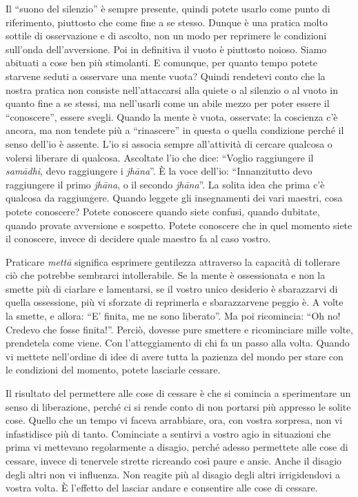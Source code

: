 Il ``suono del silenzio'' è sempre presente, quindi potete usarlo come
punto di riferimento, piuttosto che come fine a se stesso. Dunque è una
pratica molto sottile di osservazione e di ascolto, non un modo per
reprimere le condizioni sull'onda dell'avversione. Poi in definitiva il
vuoto è piuttosto noioso. Siamo abituati a cose ben più stimolanti. E
comunque, per quanto tempo potete starvene seduti a osservare una mente
vuota? Quindi rendetevi conto che la nostra pratica non consiste
nell'attaccarsi alla quiete o al silenzio o al vuoto in quanto fine a se
stessi, ma nell'usarli come un abile mezzo per poter essere il
``conoscere'', essere svegli. Quando la mente è vuota, osservate: la
coscienza c'è ancora, ma non tendete più a ``rinascere'' in questa o
quella condizione perché il senso dell'io è assente. L'io si associa
sempre all'attività di cercare qualcosa o volersi liberare di qualcosa.
Ascoltate l'io che dice: ``Voglio raggiungere il \textit{samādhi}, devo
raggiungere i \textit{jhāna}''. È la voce dell'io: ``Innanzitutto devo raggiungere
il primo \textit{jhāna}, o il secondo \textit{jhāna}''. La solita idea che prima c'è
qualcosa da raggiungere. Quando leggete gli insegnamenti dei vari
maestri, cosa potete conoscere? Potete conoscere quando siete confusi,
quando dubitate, quando provate avversione e sospetto. Potete conoscere
che in quel momento siete il conoscere, invece di decidere quale maestro
fa al caso vostro.

Praticare \textit{mettā} significa esprimere gentilezza attraverso la capacità di
tollerare ciò che potrebbe sembrarci intollerabile. Se la mente è
ossessionata e non la smette più di ciarlare e lamentarsi, se il vostro
unico desiderio è sbarazzarvi di quella ossessione, più vi sforzate di
reprimerla e sbarazzarvene peggio è. A volte la smette, e allora: ``E'
finita, me ne sono liberato''. Ma poi ricomincia: ``Oh no! Credevo che
fosse finita!''. Perciò, dovesse pure smettere e ricominciare mille
volte, prendetela come viene. Con l'atteggiamento di chi fa un passo
alla volta. Quando vi mettete nell'ordine di idee di avere tutta la
pazienza del mondo per stare con le condizioni del momento, potete
lasciarle cessare.

Il risultato del permettere alle cose di cessare è
che si comincia a sperimentare un senso di liberazione, perché ci si
rende conto di non portarsi più appresso le solite cose. Quello che un
tempo vi faceva arrabbiare, ora, con vostra sorpresa, non vi
infastidisce più di tanto. Cominciate a sentirvi a vostro agio in
situazioni che prima vi mettevano regolarmente a disagio, perché adesso
permettete alle cose di cessare, invece di tenervele strette ricreando
così paure e ansie. Anche il disagio degli altri non vi influenza. Non
reagite più al disagio degli altri irrigidendovi a vostra volta. È
l'effetto del lasciar andare e consentire alle cose di cessare.

